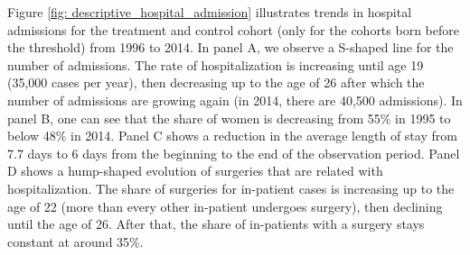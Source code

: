 \documentclass[11pt, a4paper]{article} %
\begin{document}
Figure \ref{fig: descriptive_hospital_admission} illustrates trends in hospital admissions for the treatment and control cohort (only for the cohorts born before the threshold) from 1996 to 2014. In panel A, we observe a S-shaped line for the number of admissions. The rate of hospitalization is increasing until age 19 (35,000 cases per year), then decreasing up to the age of 26 after which the number of admissions are growing again (in 2014, there are 40,500 admissions). In panel B, one can see that the share of women is decreasing from 55\% in 1995 to below 48\% in 2014. Panel C shows a reduction in the average length of stay from 7.7 days to 6 days from the beginning to the end of the observation period. Panel D shows a hump-shaped evolution of surgeries that are related with hospitalization. The share of surgeries for in-patient cases is increasing up to the age of 22 (more than every other in-patient undergoes surgery), then declining until the age of 26. After that, the share of in-patients with a surgery stays constant at around 35\%.\newline %
\end{document}
